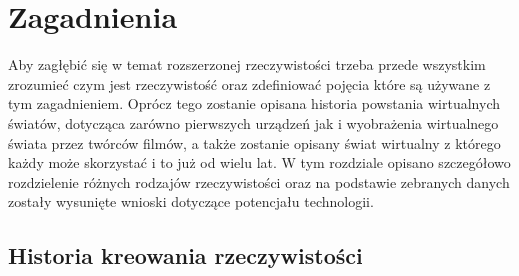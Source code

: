 \chapter{Zagadnienia}
\label{ch:zagadnienia}
Aby zagłębić się w temat rozszerzonej rzeczywistości trzeba przede wszystkim zrozumieć czym jest rzeczywistość oraz zdefiniować pojęcia które są używane z tym zagadnieniem. Oprócz tego zostanie opisana historia powstania wirtualnych światów, dotycząca zarówno pierwszych urządzeń jak i wyobrażenia wirtualnego świata przez twórców filmów, a także zostanie opisany świat wirtualny z którego każdy może skorzystać i to już od wielu lat. W tym rozdziale opisano szczegółowo rozdzielenie różnych rodzajów rzeczywistości oraz na podstawie zebranych danych zostały wysunięte wnioski dotyczące potencjału technologii.

\section{Historia kreowania rzeczywistości}
\label{sec:historia}
